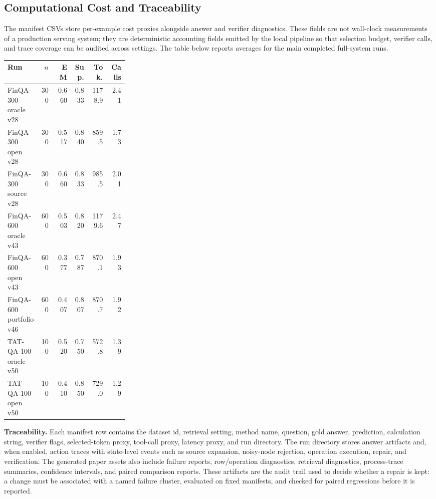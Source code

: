 \subsection{Computational Cost and Traceability}

The manifest CSVs store per-example cost proxies alongside answer and verifier
diagnostics.  These fields are not wall-clock measurements of a production
serving system; they are deterministic accounting fields emitted by the local
pipeline so that selection budget, verifier calls, and trace coverage can be
audited across settings.  The table below reports averages for the main
completed full-system runs.

\begin{center}
\small
\begin{tabular}{p{0.28\linewidth}rrrrr}
\hline
Run & \(n\) & EM & Sup. & Tok. & Calls \\
\hline
FinQA-300 oracle v28 & 300 & 0.660 & 0.833 & 1178.9 & 2.41 \\
FinQA-300 open v28 & 300 & 0.517 & 0.840 & 859.5 & 1.73 \\
FinQA-300 source v28 & 300 & 0.660 & 0.833 & 985.5 & 2.01 \\
FinQA-600 oracle v43 & 600 & 0.503 & 0.820 & 1179.6 & 2.47 \\
FinQA-600 open v43 & 600 & 0.377 & 0.787 & 870.1 & 1.93 \\
FinQA-600 portfolio v46 & 600 & 0.407 & 0.807 & 870.7 & 1.92 \\
TAT-QA-100 oracle v50 & 100 & 0.520 & 0.750 & 572.8 & 1.39 \\
TAT-QA-100 open v50 & 100 & 0.410 & 0.850 & 729.0 & 1.29 \\
\hline
\end{tabular}
\end{center}

\noindent\textbf{Traceability.}
Each manifest row contains the dataset id, retrieval setting, method name,
question, gold answer, prediction, calculation string, verifier flags,
selected-token proxy, tool-call proxy, latency proxy, and run directory.
The run directory stores answer artifacts and, when enabled, action traces with
state-level events such as source expansion, noisy-node rejection, operation
execution, repair, and verification.  The generated paper assets also include
failure reports, row/operation diagnostics, retrieval diagnostics, process-trace
summaries, confidence intervals, and paired comparison reports.  These artifacts
are the audit trail used to decide whether a repair is kept: a change must be
associated with a named failure cluster, evaluated on fixed manifests, and
checked for paired regressions before it is reported.

